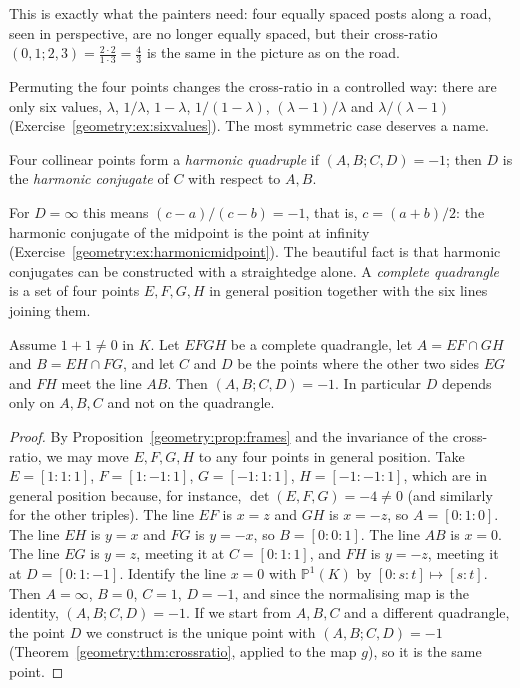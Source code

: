This is exactly what the painters need: four equally spaced posts along a road, seen in perspective, are no longer equally spaced, but their
cross-ratio $(0,1;2,3)=\frac{2\cdot2}{1\cdot3}=\frac43$ is the same in the picture as on the road.

Permuting the four points changes the cross-ratio in a controlled way: there are only six values, $\lambda$, $1/\lambda$, $1-\lambda$,
$1/(1-\lambda)$, $(\lambda-1)/\lambda$ and $\lambda/(\lambda-1)$ (Exercise~\ref{geometry:ex:sixvalues}). The most symmetric case deserves a name.

\begin{definition}
Four collinear points form a \emph{harmonic quadruple} if $(A,B;C,D)=-1$; then $D$ is the \emph{harmonic conjugate} of $C$ with respect to $A,B$.
\end{definition}

For $D=\infty$ this means $(c-a)/(c-b)=-1$, that is, $c=(a+b)/2$: the harmonic conjugate of the midpoint is the point at infinity
(Exercise~\ref{geometry:ex:harmonicmidpoint}). The beautiful fact is that harmonic conjugates can be constructed with a straightedge alone. A
\emph{complete quadrangle} is a set of four points $E,F,G,H$ in general position together with the six lines joining them.

\begin{theorem}\label{geometry:thm:harmonic}
Assume $1+1\ne0$ in $K$. Let $EFGH$ be a complete quadrangle, let $A=EF\cap GH$ and $B=EH\cap FG$, and let $C$ and $D$ be the points where the
other two sides $EG$ and $FH$ meet the line $AB$. Then $(A,B;C,D)=-1$. In particular $D$ depends only on $A,B,C$ and not on the quadrangle.
\end{theorem}

\begin{proof}
By Proposition~\ref{geometry:prop:frames} and the invariance of the cross-ratio, we may move $E,F,G,H$ to any four points in general position. Take
$E=[1:1:1]$, $F=[1:-1:1]$, $G=[-1:1:1]$, $H=[-1:-1:1]$, which are in general position because, for instance, $\det(E,F,G)=-4\ne0$ (and similarly for the
other triples). The line $EF$ is $x=z$ and $GH$ is $x=-z$, so $A=[0:1:0]$. The line $EH$ is $y=x$ and $FG$ is $y=-x$, so $B=[0:0:1]$. The line $AB$
is $x=0$. The line $EG$ is $y=z$, meeting it at $C=[0:1:1]$, and $FH$ is $y=-z$, meeting it at $D=[0:1:-1]$. Identify the line $x=0$ with
$\mathbb P^1(K)$ by $[0:s:t]\mapsto[s:t]$. Then $A=\infty$, $B=0$, $C=1$, $D=-1$, and since the normalising map is the identity,
$(A,B;C,D)=-1$. If we start from $A,B,C$ and a different quadrangle, the point $D$ we construct is the unique point with $(A,B;C,D)=-1$
(Theorem~\ref{geometry:thm:crossratio}, applied to the map $g$), so it is the same point.
\end{proof}

